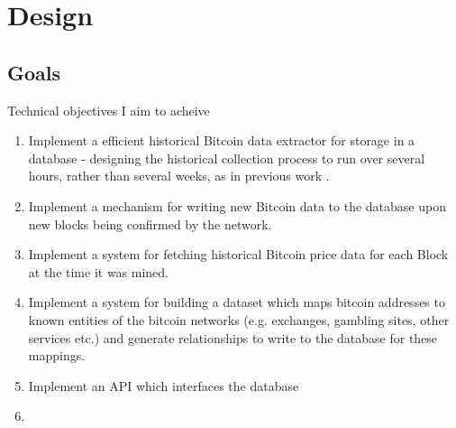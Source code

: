 \chapter{Design}

\section{Goals}
Technical objectives I aim to acheive
\begin{enumerate}
    \item Implement a efficient historical Bitcoin data extractor for storage in a database - designing the historical collection process to run over several hours, rather than several weeks, as in previous work \cite{RefWorks:doc:5c98e031e4b068320632cef2}.
    \item Implement a mechanism for writing new Bitcoin data to the database upon new blocks being confirmed by the network.
    \item Implement a system for fetching historical Bitcoin price data for each Block at the time it was mined.
    \item Implement a system for building a dataset which maps bitcoin addresses to known entities of the bitcoin networks (e.g. exchanges, gambling sites, other services etc.) and generate relationships to write to the database for these mappings.
    \item Implement an API which interfaces the database
    \item {}
\end{enumerate}
\section{}






